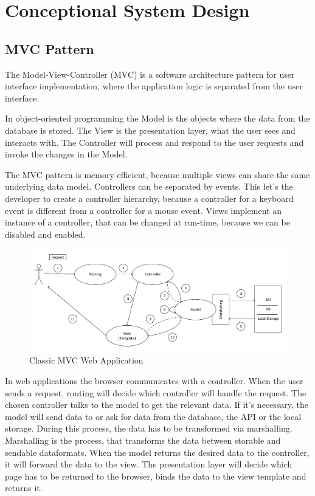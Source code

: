 \chapter{Conceptional System Design}


\section{MVC Pattern}
\label{mvc}

The Model-View-Controller (MVC) is a software architecture pattern for user interface implementation, where the application logic is separated from the user interface.

In object-oriented programming the Model is the objects where the data from the database is stored. The View is the presentation layer, what the user sees and interacts with. The Controller will process and respond to the user requests and invoke the changes in the Model. 

The MVC pattern is memory efficient, because multiple views can share the same underlying data model. Controllers can be separated by events. This let's the developer to create a controller hierarchy, because a controller for a keyboard event is different from a controller for a mouse event. Views implement an instance of a controller, that can be changed at run-time, because we can be disabled and enabled.


\begin{figure}[!ht]
	\includegraphics[width=\textwidth]{figures/klasszikus_mvc_webalkalmazas.pdf}
	\caption[Classic MVC Web Application]{Classic MVC Web Application\footnotemark}
	\label{fig:classic-mvc-webapplication}
\end{figure}

In web applications the browser communicates with a controller. When the user sends a request, routing will decide which controller will handle the request. The chosen controller talks to the model to get the relevant data. If it's necessary, the model will send data to or ask for data from the database, the API or the local storage. During this process, the data has to be transformed via marshalling. Marshalling is the process, that transforms the data between storable and sendable dataformats. When the model returns the desired data to the controller, it will forward the data to the view. The presentation layer will decide which page has to be returned to the browser, binds the data to the view template and returns it.

